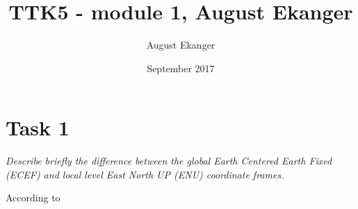 \documentclass{article}
\title{TTK5 - module 1, August Ekanger}
\author{August Ekanger }
\date{September 2017}
\begin{document}
	
	\maketitle
	\cite{FossenThorI2011HoMC}
	\section{Task 1}
	\textit{Describe briefly the difference between the global Earth Centered Earth Fixed (ECEF) and
		local level East North UP (ENU) coordinate frames.}
	
	
	 
	 
	
	According to \cite{ref:FossenThorI2011HoMC}
	\printbibliography
\end{document}
